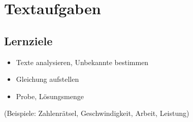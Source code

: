 \section{Textaufgaben}

\subsection*{Lernziele}

\begin{itemize}
\item Texte analysieren, Unbekannte bestimmen
\item Gleichung aufstellen
\item Probe, Lösungsmenge
\end{itemize}
(Beispiele: Zahlenrätsel, Geschwindigkeit, Arbeit, Leistung)

\newpage

